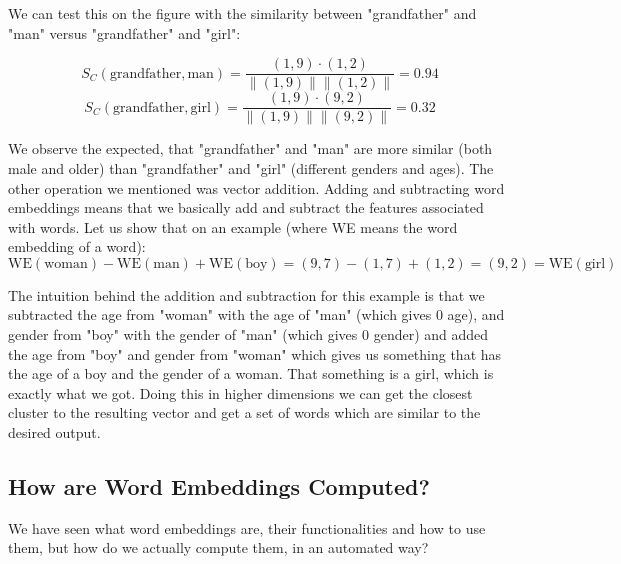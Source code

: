 \documentclass[12pt]{article}
\numberwithin{equation}{section}
\begin{document}
\begin{spacing}{1.5}
	We can test this on the figure with the similarity between "grandfather" and "man" versus "grandfather" and "girl":
	
	$$ S_C(\text{grandfather}, \text{man}) = \frac{(1, 9) \cdot (1, 2)}{\|(1, 9)\| \|(1, 2)\|} = 0.94 $$ 
	$$ S_C(\text{grandfather}, \text{girl}) = \frac{(1, 9) \cdot (9, 2)}{\|(1, 9)\| \|(9, 2)\|} = 0.32 $$ 
	
	We observe the expected, that "grandfather" and "man" are more similar (both male and older) than "grandfather" and "girl" (different genders and ages). The other operation we mentioned was vector addition. Adding and subtracting word embeddings means that we basically add and subtract the features associated with words. Let us show that on an example (where WE means the word embedding of a word):
	$$ \text{WE}(\text{woman}) - \text{WE}(\text{man}) + \text{WE}(\text{boy}) = (9, 7) - (1,7) + (1, 2) = (9, 2) = \text{WE}(\text{girl})$$
	
	The intuition behind the addition and subtraction for this example is that we subtracted the age from "woman" with the age of "man" (which gives $0$ age), and gender from "boy" with the gender of "man" (which gives $0$ gender) and added the age from "boy" and gender from "woman" which gives us something that has the age of a boy and the gender of a woman. That something is a girl, which is exactly what we got. Doing this in higher dimensions we can get the closest cluster to the resulting vector and get a set of words which are similar to the desired output.
	
	\subsection{How are Word Embeddings Computed?}
	We have seen what word embeddings are, their functionalities and how to use them, but how do we actually compute them, in an automated way? \\
	

\end{spacing}
\end{document}
